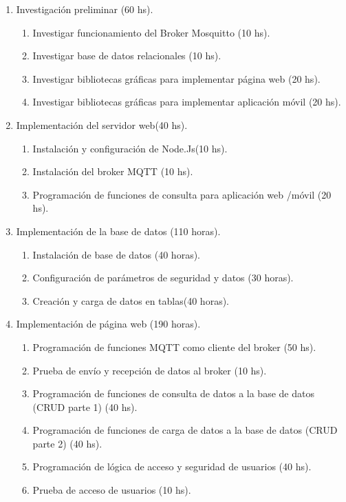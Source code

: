 \documentclass[
11pt, %
]{charter}
\begin{document}
\begin{enumerate}
\item Investigación preliminar (60 hs).
	\begin{enumerate}
	\item Investigar funcionamiento del Broker Mosquitto (10 hs).
	\item Investigar base de datos relacionales (10 hs).
	\item Investigar bibliotecas gráficas para implementar página web (20 hs).
	\item Investigar bibliotecas gráficas para implementar aplicación móvil (20 hs).
	\end{enumerate}
\item Implementación del servidor web(40 hs).
	\begin{enumerate}
	\item Instalación y configuración de Node.Js(10 hs).
	\item Instalación del broker MQTT (10 hs).
	\item Programación de funciones de consulta para aplicación web /móvil (20 hs).

	\end{enumerate}
\item Implementación de la base de datos (110 horas).
	\begin{enumerate}
	\item Instalación de base de datos (40 horas).
	\item Configuración de parámetros de seguridad y datos (30 horas).
	\item Creación y carga de datos en tablas(40 horas).

	\end{enumerate}
\item Implementación de página web (190 horas).
	\begin{enumerate}
	\item Programación de funciones MQTT como cliente del broker (50 hs).
	\item Prueba de envío y recepción de datos al broker (10 hs).
	\item Programación de funciones de consulta de datos a la base de datos (CRUD parte 1) (40 hs).
	\item Programación de funciones de carga de datos a la base de datos (CRUD parte 2) (40 hs).
	\item Programación de lógica de acceso y seguridad de usuarios (40 hs).
	\item Prueba de acceso de usuarios (10 hs).
	\end{enumerate}
	

\end{enumerate}
\end{document}
